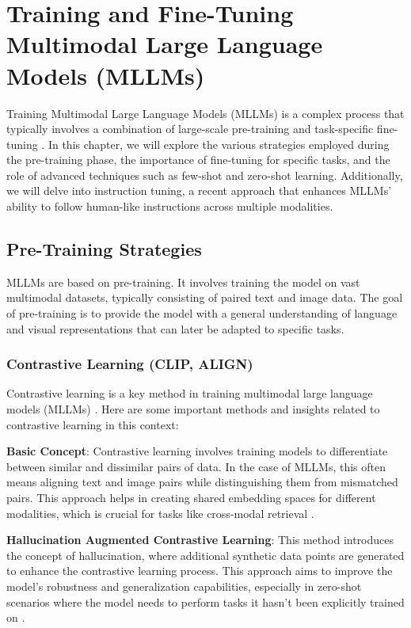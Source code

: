 \chapter{Training and Fine-Tuning Multimodal Large Language Models (MLLMs)}



Training Multimodal Large Language Models (MLLMs) is a complex process that typically involves a combination of large-scale pre-training and task-specific fine-tuning \cite{caffagni2024r}. In this chapter, we will explore the various strategies employed during the pre-training phase, the importance of fine-tuning for specific tasks, and the role of advanced techniques such as few-shot and zero-shot learning. Additionally, we will delve into instruction tuning, a recent approach that enhances MLLMs' ability to follow human-like instructions across multiple modalities.

\section{Pre-Training Strategies}

MLLMs are based on pre-training. It involves training the model on vast multimodal datasets, typically consisting of paired text and image data. The goal of pre-training is to provide the model with a general understanding of language and visual representations that can later be adapted to specific tasks.

\subsection{Contrastive Learning (CLIP, ALIGN)}

Contrastive learning is a key method in training multimodal large language models (MLLMs) \cite{zhang2024mm}. Here are some important methods and insights related to contrastive learning in this context:

\textbf{Basic Concept}: Contrastive learning involves training models to differentiate between similar and dissimilar pairs of data. In the case of MLLMs, this often means aligning text and image pairs while distinguishing them from mismatched pairs. This approach helps in creating shared embedding spaces for different modalities, which is crucial for tasks like cross-modal retrieval \cite{cite4}.

\textbf{Hallucination Augmented Contrastive Learning}: This method introduces the concept of hallucination, where additional synthetic data points are generated to enhance the contrastive learning process. This approach aims to improve the model's robustness and generalization capabilities, especially in zero-shot scenarios where the model needs to perform tasks it hasn't been explicitly trained on \cite{cite1, cite2}.

